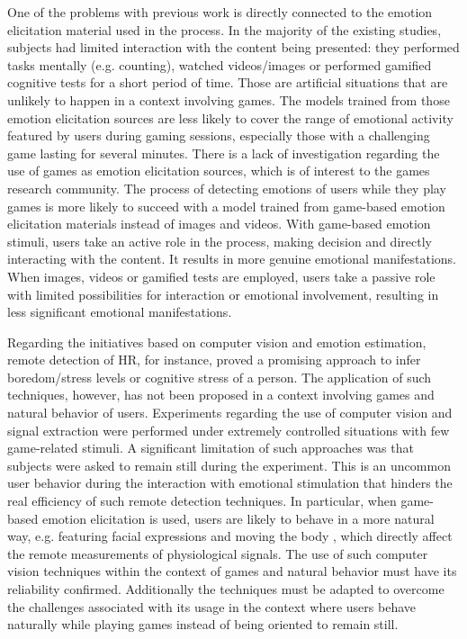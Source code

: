 One of the problems with previous work is directly connected to the emotion elicitation material used in the process. In the majority of the existing studies, subjects had limited interaction with the content being presented: they performed tasks mentally (e.g. counting), watched videos/images or performed gamified cognitive tests for a short period of time. Those are artificial situations that are unlikely to happen in a context involving games. The models trained from those emotion elicitation sources are less likely to cover the range of emotional activity featured by users during gaming sessions, especially those with a challenging game lasting for several minutes. There is a lack of investigation regarding the use of games as emotion elicitation sources, which is of interest to the games research community. The process of detecting emotions of users while they play games is more likely to succeed with a model trained from game-based emotion elicitation materials instead of images and videos. With game-based emotion stimuli, users take an active role in the process, making decision and directly interacting with the content. It results in more genuine emotional manifestations. When images, videos or gamified tests are employed, users take a passive role with limited possibilities for interaction or emotional involvement, resulting in less significant emotional manifestations.

Regarding the initiatives based on computer vision and emotion estimation, remote detection of HR, for instance, proved a promising approach to infer boredom/stress levels \parencite{kukolja2014comparative} or cognitive stress \parencite{mcduff2014remote} of a person. The application of such techniques, however, has not been proposed in a context involving games and natural behavior of users. Experiments regarding the use of computer vision and signal extraction were performed under extremely controlled situations with few game-related stimuli. A significant limitation of such approaches was that subjects were asked to remain still during the experiment. This is an uncommon user behavior during the interaction with emotional stimulation that hinders the real efficiency of such remote detection techniques. In particular, when game-based emotion elicitation is used, users are likely to behave in a more natural way, e.g. featuring facial expressions and moving the body \parencite{bevilacqua2016variations}, which directly affect the remote measurements of physiological signals. The use of such computer vision techniques within the context of games and natural behavior must have its reliability confirmed. Additionally the techniques must be adapted to overcome the challenges associated with its usage in the context where users behave naturally while playing games instead of being oriented to remain still.

